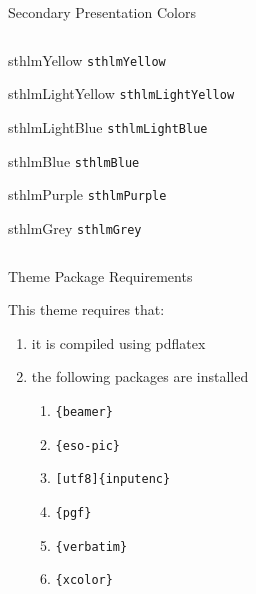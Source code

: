 \documentclass[compress,PxFont]{beamer}
\begin{document}
\begin{frame}{Secondary Presentation Colors}
\begin{columns}
\begin{column}{.48\linewidth}
\begin{beamercolorbox}[wd=\linewidth,ht=2ex,dp=0.7ex]{sthlmYellow}
	\texttt{sthlmYellow}
\end{beamercolorbox}

\begin{beamercolorbox}[wd=\linewidth,ht=2ex,dp=0.7ex]{sthlmLightYellow}
	\texttt{sthlmLightYellow}
\end{beamercolorbox}

\begin{beamercolorbox}[wd=\linewidth,ht=2ex,dp=0.7ex]{sthlmLightBlue}
	\texttt{sthlmLightBlue}
\end{beamercolorbox}

\begin{beamercolorbox}[wd=\linewidth,ht=2ex,dp=0.7ex]{sthlmBlue}
	\texttt{sthlmBlue}
\end{beamercolorbox}

\begin{beamercolorbox}[wd=\linewidth,ht=2ex,dp=0.7ex]{sthlmPurple}
	\texttt{sthlmPurple}
\end{beamercolorbox}

\begin{beamercolorbox}[wd=\linewidth,ht=2ex,dp=0.7ex]{sthlmGrey}
	\texttt{sthlmGrey}
\end{beamercolorbox}

\end{column}
\end{columns}
\end{frame}


\begin{frame}[containsverbatim]{Theme Package Requirements}

This theme requires that:

\begin{enumerate}
	\item it is compiled using pdflatex 
	\item the following packages are installed
	\begin{enumerate}
		\item \verb|{beamer}|
		\item \verb|{eso-pic}|
		\item \verb|[utf8]{inputenc}|
		\item \verb|{pgf}|
		\item \verb|{verbatim}|
		\item \verb|{xcolor}|
	\end{enumerate}
\end{enumerate}

\end{frame}
\end{document}
